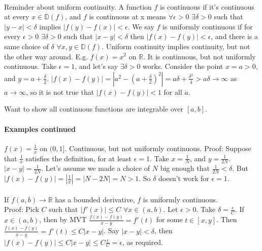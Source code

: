 \documentclass[10pt,letter]{article}
\begin{document}
\paragraph{}
Reminder about uniform continuity. A function $f$ is continuous if it's continuous at every $x\in \mathbb{D}(f)$, and $f$ is continuous at x means $\forall\epsilon>0$ $\exists\delta>0$ such that $|y-x|<\delta$ implies $|f(y)-f(x)|<\epsilon$. We say $f$ is uniformly continuous if for every $\epsilon>0$ $\exists\delta>0$ such that $|x-y|<\delta$ then $|f(x)-f(y)|<\epsilon$, and there is a same choice of $\delta$ $\forall x,y\in\mathbb{D}(f)$. Uniform continuity implies continuity, but not the other way around. E.g. $f(x)=x^2$ on $\mathbb{R}$. It is continuous, but not uniformly continuous. Take $\epsilon=1$, and let's say $\exists\delta>0$ works. Consider the point $x=a>0$, and $y=a+\frac{\delta}{2}$. $|f(x)-f(y)|=|a^2-(a+\frac{\delta}{2})^2|=a\delta+\frac{\delta^2}{4}>a\delta\rightarrow\infty$ as $a\rightarrow\infty$, so it is not true that $|f(x)-f(y)|<1$ for all $a$. 

Want to show all continuous functions are integrable over $[a,b]$.  

\paragraph*{Examples continued}
$f(x)=\frac{1}{x}$ on $(0,1]$. Continuous, but not uniformly continuous. Proof: Suppose that $\frac{1}{x}$ satisfies the definition, for at least $\epsilon=1$. Take $x=\frac{1}{N}$, and $y=\frac{1}{2N}$. $|x-y|=\frac{1}{2N}$. Let's assume we made a choice of $N$ big enough that $\frac{1}{2N}<\delta$. But $|f(x)-f(y)|=|\frac{1}{x}|=|N-2N|=N>1$. So $\delta$ doesn't work for $\epsilon=1$. \\ \\ 

If $f(a,b)\rightarrow\mathbb{R}$ has a bounded derivative, $f$ is uniformly continuous. \\ 
Proof: Pick $C$ such that $|f'(x)|\leq C$ $\forall x\in(a,b)$. Let $\epsilon>0$. Take $\delta=\frac{\epsilon}{C}$. If $x\in(a,b)$, then by MVT $\frac{f(x)-f(y)}{x-y}=f'(t)$ for some $t\in[x,y]$. Then $\frac{f(x)-f(y)}{x-y}=f'(t)\leq C|x-y|$. Say $|x-y|<\delta$, then $|f(x)-f(y)|\leq C|x-y|\leq C\frac{\epsilon}{C}=\epsilon$, as required. 
\end{document}
